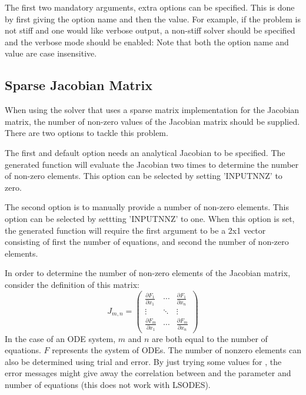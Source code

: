The first two mandatory arguments, extra options can be specified. This is done by first giving the option name and then the value. For example, if the problem is not stiff and one would like verbose output, a non-stiff solver should be specified and the verbose mode should be enabled:
Note that both the option name and value are case insensitive.

\subsection{Sparse Jacobian Matrix}
When using the solver that uses a sparse matrix implementation for the Jacobian matrix, the number of non-zero values of the Jacobian matrix should be supplied. There are two options to tackle this problem.

The first and default option needs an analytical Jacobian to be specified. The generated function will evaluate the Jacobian two times to determine the number of non-zero elements. This option can be selected by setting 'INPUTNNZ' to zero.

The second option is to manually provide a number of non-zero elements. This option can be selected by settting 'INPUTNNZ' to one. When this option is set, the generated function will require the first argument to be a 2x1 vector consisting of first the number of equations, and second the number of non-zero elements.

In order to determine the number of non-zero elements of the Jacobian matrix, consider the definition of this matrix:
\begin{equation}
  J_{m,n} =
  \begin{pmatrix}
   \frac{\partial F_1}{\partial x_1} & \cdots & \frac{\partial F_1}{\partial x_n} \\
   \vdots & \ddots & \vdots  \\
   \frac{\partial F_m}{\partial x_1} & \cdots & \frac{\partial F_m}{\partial x_n}
  \end{pmatrix}
\end{equation}
In the case of an ODE system, $m$ and $n$ are both equal to the number of equations. $F$ represents the system of ODEs.
The number of nonzero elements can also be determined using trial and error. By just trying some values for , the error messages might give away the correlation between  and the parameter and number of equations (this does not work with LSODES).

